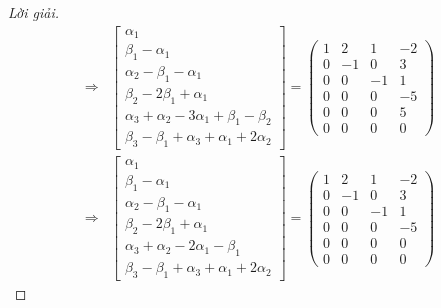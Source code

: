\begin{proof}[Lời giải]
\begin{align*}
        \Longrightarrow &
        \begin{bmatrix}
            \alpha_{1}                                                    \\
            \beta_{1} - \alpha_{1}                                        \\
            \alpha_{2} - \beta_{1} - \alpha_{1}                           \\
            \beta_{2} - 2\beta_{1} + \alpha_{1}                           \\
            \alpha_{3} + \alpha_{2} - 3\alpha_{1} + \beta_{1} - \beta_{2} \\
            \beta_{3} - \beta_{1} + \alpha_{3} + \alpha_{1} + 2\alpha_{2}
        \end{bmatrix}=
        \begin{pmatrix}
            1 & 2  & 1  & -2 \\
            0 & -1 & 0  & 3  \\
            0 & 0  & -1 & 1  \\
            0 & 0  & 0  & -5 \\
            0 & 0  & 0  & 5  \\
            0 & 0  & 0  & 0
        \end{pmatrix}                 \\
        \Longrightarrow &
        \begin{bmatrix}
            \alpha_{1}                                        \\
            \beta_{1} - \alpha_{1}                            \\
            \alpha_{2} - \beta_{1} - \alpha_{1}               \\
            \beta_{2} - 2\beta_{1} + \alpha_{1}               \\
            \alpha_{3} + \alpha_{2} - 2\alpha_{1} - \beta_{1} \\
            \beta_{3} - \beta_{1} + \alpha_{3} + \alpha_{1} + 2\alpha_{2}
        \end{bmatrix}=
        \begin{pmatrix}
            1 & 2  & 1  & -2 \\
            0 & -1 & 0  & 3  \\
            0 & 0  & -1 & 1  \\
            0 & 0  & 0  & -5 \\
            0 & 0  & 0  & 0  \\
            0 & 0  & 0  & 0
        \end{pmatrix}
    \end{align*}
    

\end{proof}

